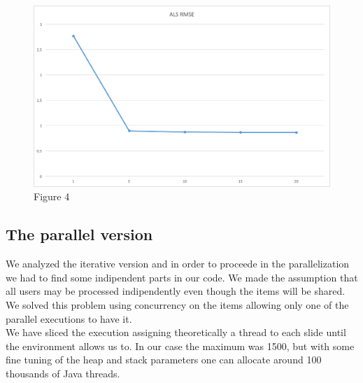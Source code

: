 \documentclass{sig-alternate-05-2015}
\begin{document}
\begin{figure}
    \caption{Figure 4}
    \centering
    \includegraphics[scale=0.4]{alsrmse.png}
\end{figure}

\subsection{The parallel version}
We analyzed the iterative version and in order to proceede in the parallelization
we had to find some indipendent parts in our code. We made the assumption
that all users may be processed indipendently even though the items will be shared.
We solved this problem using concurrency on the items allowing only one of the
parallel executions to have it. \\
We have sliced the execution assigning theoretically a thread to each slide
until the environment allows us to. In our case the maximum was 1500, but with
some fine tuning of the heap and stack parameters one can allocate around 100 thousands
of Java threads.\cite{stack}\\
\end{document}
